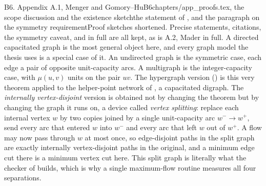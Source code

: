 \begin{offcutrewrite}{B6. Appendix A.1, Menger and Gomory--Hu}{B6}{chapters/app\_proofs.tex, the scope discussion and the existence sketch}{the statement of , and the paragraph on the symmetry requirement}{Proof sketches shortened. Precise statements, citations, the symmetry caveat, and  in full are all kept, as is A.2, Mader in full.}
A directed capacitated graph is the most general object here, and every graph model the thesis uses is a special case of it. An undirected graph is the symmetric case, each edge a pair of opposite unit-capacity arcs. A multigraph is the integer-capacity case, with $\mu(u,v)$ units on the pair $uv$. The hypergraph version () is this very theorem applied to the helper-point network of , a capacitated digraph. The \emph{internally vertex-disjoint} version is obtained not by changing the theorem but by changing the graph it runs on, a device called \emph{vertex splitting}: replace each internal vertex $w$ by two copies joined by a single unit-capacity arc $w^- \to w^+$, send every arc that entered $w$ into $w^-$ and every arc that left $w$ out of $w^+$. A flow may now pass through $w$ at most once, so edge-disjoint paths in the split graph are exactly internally vertex-disjoint paths in the original, and a minimum edge cut there is a minimum vertex cut here. This split graph is literally what the checker of  builds, which is why a single maximum-flow routine measures all four separations.


\end{offcutrewrite}

